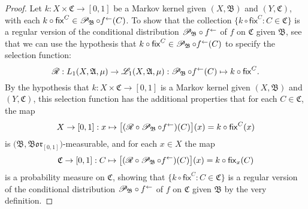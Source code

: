 \documentclass[
twoside=true,
paper=letter,
fontsize=11pt,
pagesize=auto,
leqno,
openany,
headsepline,
overfullrule,
]{scrbook}
\theoremstyle{plain}
\theoremstyle{plain}
\theoremstyle{definition}
\theoremstyle{bfnoteitalic}
\theoremstyle{bfnoteroman}
\newcommand{\sigalg}[1]{\mathfrak{#1}}
\newcommand{\cali}[1]{\mathscr{#1}}
\newcommand{\sfop}[1]{\mathsf{#1}}
\newcommand{\condprobop}[1]{\mathop{\cali{P}\hspace{-1pt}}\nolimits_{#1}}
\newcommand{\borel}{\mathfrak{Bor}}
\newcommand{\preimage}[1]{#1^{\leftarrow}}
\newcommand{\sigmaalgebra}{\sigalg{A}}
\newcommand{\sigmaalgebraii}{\sigalg{B}}
\newcommand{\sigmaalgebraiii}{\sigalg{C}}
\newcommand{\Lone}{L_1(\measurespace, \sigmaalgebra, \measure)}
\newcommand{\caliLone}{\cali{L}_1(\measurespace, \sigmaalgebra, \measure)}
\newcommand{\function}{f}
\newcommand{\measurespace}{X}
\newcommand{\measurespaceii}{Y}
\newcommand{\mspaceelt}{x}
\newcommand{\measure}{\mu}
\newcommand{\setiii}{C}
\newcommand{\regular}{\cali{R}}
\newcommand{\markovkernel}{k}
\newcommand{\fixinthefirst}[1]{\sfop{fix}_{#1}}
\newcommand{\fixinthesecond}[1]{\sfop{fix}^{#1}}
\begin{document}
\begin{proof}
Let 
$\markovkernel:\measurespace\times\sigmaalgebraiii\to [0,1]$ 
be a Markov kernel given $(\measurespace, \sigmaalgebraii)$ and $(\measurespaceii, \sigmaalgebraiii)$, with each
$\markovkernel\circ\fixinthesecond{\setiii} \in \condprobop{\sigmaalgebraii}\circ \preimage{\function}(\setiii)$.
To show that the collection 
$\{ \markovkernel\circ\fixinthesecond{\setiii} :
\setiii\in\sigmaalgebraiii\}$ 
is a regular version of the conditional distribution 
${\condprobop{\sigmaalgebraii}}\circ \preimage{\function}$ of 
$\function$ on $\sigmaalgebraiii$ given $\sigmaalgebraii$, see that we can 
use the hypothesis that 
$\markovkernel\circ\fixinthesecond{\setiii} \in \condprobop{\sigmaalgebraii}\circ \preimage{\function}(\setiii)$ 
to specify the selection function:
\[
\regular:\Lone\to\caliLone:
\condprobop{\sigmaalgebraii}\circ \preimage{\function}(\setiii) \mapsto
\markovkernel\circ\fixinthesecond{\setiii}. 
\]
By the hypothesis that
$\markovkernel:\measurespace\times\sigmaalgebraiii\to [0,1]$ 
is a Markov kernel given $(\measurespace, \sigmaalgebraii)$ and $(\measurespaceii, \sigmaalgebraiii)$,
this selection function has the  additional properties that for each
$\setiii\in\sigmaalgebraiii$, the map 
\[
\measurespace\to [0,1] : \mspaceelt\mapsto
\bigl[ (\regular\circ\condprobop{\sigmaalgebraii}\circ\preimage{\function}) (\setiii)\bigr](\mspaceelt) 
=
\markovkernel\circ\fixinthesecond{\setiii} (\mspaceelt)
\]
is $\bigl(\sigmaalgebraii, \borel_{[0,1]}\bigr)$\hyp{}measurable, and for each 
$\mspaceelt\in\measurespace$ the  map
\[
\sigmaalgebraiii\to [0,1]: \setiii \mapsto 
\bigl[ (\regular\circ\condprobop{\sigmaalgebraii}\circ\preimage{\function}) (\setiii)\bigr](\mspaceelt)
= \markovkernel\circ\fixinthefirst{\mspaceelt}(\setiii)
\]
is a probability measure on $\sigmaalgebraiii$, 
showing that 
$\{ \markovkernel\circ\fixinthesecond{\setiii} :
\setiii\in\sigmaalgebraiii\}$ 
is a regular version of the conditional distribution 
${\condprobop{\sigmaalgebraii}}\circ \preimage{\function}$ of 
$\function$ on $\sigmaalgebraiii$ given $\sigmaalgebraii$ by the very definition.


\end{proof}
\end{document}
